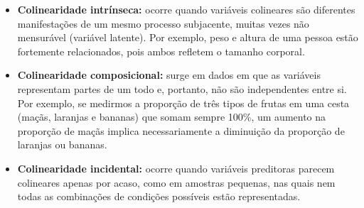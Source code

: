 \begin{itemize}
	\item \textbf{Colinearidade intrínseca:} ocorre quando variáveis colineares são diferentes manifestações de um mesmo processo subjacente, muitas vezes não mensurável (variável latente). Por exemplo, peso e altura de uma pessoa estão fortemente relacionados, pois ambos refletem o tamanho corporal.
	
	\item \textbf{Colinearidade composicional:} surge em dados em que as variáveis representam partes de um todo e, portanto, não são independentes entre si. Por exemplo, se medirmos a proporção de três tipos de frutas em uma cesta (maçãs, laranjas e bananas) que somam sempre 100\%, um aumento na proporção de maçãs implica necessariamente a diminuição da proporção de laranjas ou bananas.
	
	\item \textbf{Colinearidade incidental:} ocorre quando variáveis preditoras parecem colineares apenas por acaso, como em amostras pequenas, nas quais nem todas as combinações de condições possíveis estão representadas.
\end{itemize}









